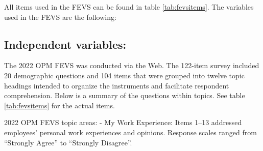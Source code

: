 \documentclass[
  man]{apa7}
\begin{document}
All items used in the FEVS can be found in table \ref{tab:fevsitems}. The variables used in the FEVS are the following:

\hypertarget{independent-variables}{%
\subsection{Independent variables:}\label{independent-variables}}

The 2022 OPM FEVS was conducted via the Web. The 122-item survey included 20 demographic questions and 104 items that were grouped into twelve topic headings intended to organize the instruments and facilitate respondent comprehension. Below is a summary of the questions within topics. See table \ref{tab:fevsitems} for the actual items.

2022 OPM FEVS topic areas:
- My Work Experience: Items 1--13 addressed employees' personal work experiences and opinions. Response scales ranged from ``Strongly Agree'' to ``Strongly Disagree''.
\end{document}
